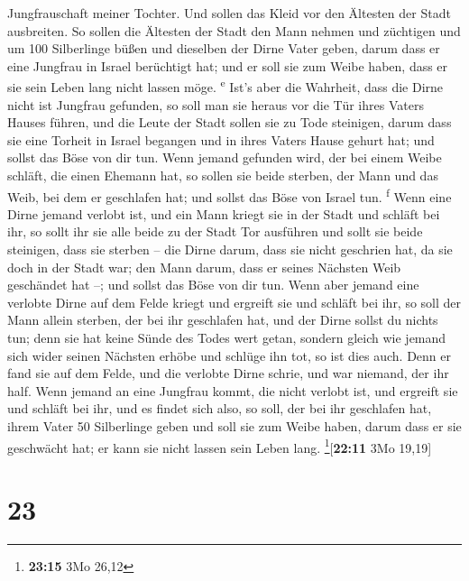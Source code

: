 Jungfrauschaft meiner Tochter. Und sollen das Kleid vor den Ältesten der
Stadt ausbreiten.  So sollen die Ältesten der Stadt den
Mann nehmen und züchtigen  und um 100 Silberlinge büßen
und dieselben der Dirne Vater geben, darum dass er eine Jungfrau in
Israel berüchtigt hat; und er soll sie zum Weibe haben, dass er sie sein
Leben lang nicht lassen möge. \textsuperscript{e}  Ist's
aber die Wahrheit, dass die Dirne nicht ist Jungfrau gefunden,
 so soll man sie heraus vor die Tür ihres Vaters Hauses
führen, und die Leute der Stadt sollen sie zu Tode steinigen, darum dass
sie eine Torheit in Israel begangen und in ihres Vaters Hause gehurt
hat; und sollst das Böse von dir tun.  Wenn jemand
gefunden wird, der bei einem Weibe schläft, die einen Ehemann hat, so
sollen sie beide sterben, der Mann und das Weib, bei dem er geschlafen
hat; und sollst das Böse von Israel tun. \textsuperscript{f}
 Wenn eine Dirne jemand verlobt ist, und ein Mann kriegt
sie in der Stadt und schläft bei ihr,  so sollt ihr sie
alle beide zu der Stadt Tor ausführen und sollt sie beide steinigen,
dass sie sterben -- die Dirne darum, dass sie nicht geschrien hat, da
sie doch in der Stadt war; den Mann darum, dass er seines Nächsten Weib
geschändet hat --; und sollst das Böse von dir tun.  Wenn
aber jemand eine verlobte Dirne auf dem Felde kriegt und ergreift sie
und schläft bei ihr, so soll der Mann allein sterben, der bei ihr
geschlafen hat,  und der Dirne sollst du nichts tun; denn
sie hat keine Sünde des Todes wert getan, sondern gleich wie jemand sich
wider seinen Nächsten erhöbe und schlüge ihn tot, so ist dies auch.
 Denn er fand sie auf dem Felde, und die verlobte Dirne
schrie, und war niemand, der ihr half.  Wenn jemand an
eine Jungfrau kommt, die nicht verlobt ist, und ergreift sie und schläft
bei ihr, und es findet sich also,  so soll, der bei ihr
geschlafen hat, ihrem Vater 50 Silberlinge geben und soll sie zum Weibe
haben, darum dass er sie geschwächt hat; er kann sie nicht lassen sein
Leben lang. \footnote{\textbf{23:15} 3Mo 26,12}{[}\textbf{22:11} 3Mo
19,19{]}

\hypertarget{section-22}{%
\section{23}\label{section-22}}

